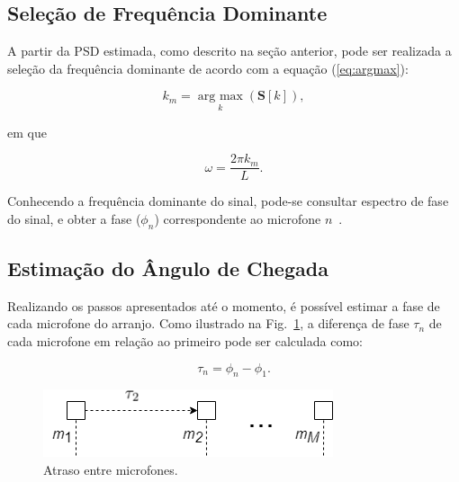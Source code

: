 \documentclass{sbrt2017port}
\begin{document}


\subsection{Seleção de Frequência Dominante}

A partir da PSD estimada, como descrito na seção anterior, pode ser realizada a seleção da frequência dominante de acordo com a equação (\ref{eq:argmax}):  
 
 \begin{equation}\label{eq:argmax}
 k_m = \underset{k}{\operatorname{arg \ max}}(\mathbold {S}[k]), 
 \end{equation}

em que 

\begin{equation}
\omega = \frac{2\pi k_m}{L}.
\end{equation}


Conhecendo a frequência dominante do sinal, pode-se consultar espectro de fase do sinal, e obter a fase ($\phi_n$) correspondente ao microfone $n$~\cite{Telgarsky2013DominantExtraction}.
 
\subsection{Estimação do Ângulo de Chegada}
Realizando os passos apresentados até o momento, é possível estimar a fase de cada microfone do arranjo. Como ilustrado na Fig.~\ref{fig:delay}, a diferença de fase $\tau_{n}$ de cada microfone em relação ao primeiro pode ser calculada como:

\begin{equation}\label{eq:media_tau}
\tau_{n} = \phi_n - \phi_1.
\end{equation}

\begin{figure}[!htb]
     \centering
     \includegraphics[scale=0.4]{images/delay_microphones.png}
     \caption{Atraso entre microfones.}
     \label{fig:delay}
\end{figure}
\end{document}
